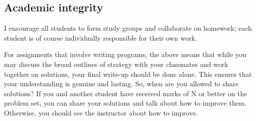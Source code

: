 \documentclass[symmetric]{tufte-handout}
\begin{document}



\subsection{Academic integrity}

I encourage all students to form study groups and collaborate on homework;
each student is of course individually responsible for their own work.

For assignments that involve writing programs, the above means that while you may discuss
the broad outlines of strategy with your classmates and work together on solutions, your
final write-up should be done alone. This ensures that your understanding is genuine and
lasting. So, when are you allowed to share solutions? If you and another student have
received marks of N or better on the problem set, you can share your solutions and talk
about how to improve them. Otherwise, you should see the instructor about how to improve.
\end{document}
